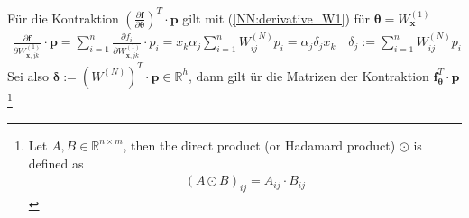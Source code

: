 \documentclass[a4paper, 12pt]{scrartcl}
\begin{document}
Für die Kontraktion $\left(\frac{\partial \bm{f}}{\partial \bm{\theta}}\right)^T \cdot \bm{p}$ gilt
mit (\ref{NN:derivative_W1}) für $\bm{\theta}= W_{\bm{x}}^{(1)}$
\begin{align*}
    \frac{\partial \bm{f}}{\partial W_{\bm{x}, jk}^{(1)}} \cdot \bm{p} 
    =
    \sum_{i=1}^{n} 
        \frac{\partial f_i}{\partial W_{\bm{x}, jk}^{(1)}} \cdot p_i 
    =
    x_k 
    \alpha_j 
    \sum_{i=1}^{n} 
    W_{ij}^{(N)} p_i
    =    
    \alpha_j 
    \delta_j
    x_k 
    \quad
    \delta_j := \sum_{i=1}^{n} W_{ij}^{(N)} p_i
\end{align*}
Sei also $\bm{\delta} := \left(W^{(N)}\right)^T \cdot \bm{p} \in \mathbb{R}^h$, dann gilt
ür die Matrizen der Kontraktion $\bm{f}_{\bm{\theta}}^T \cdot \bm{p}$
\footnote{
    Let $A,B \in \mathbb{R}^{n \times m}$, then the direct product 
    (or Hadamard product) $\odot$ is defined as
    \begin{align*}
        \left(A \odot B\right)_{ij} 
        =
        A_{ij} \cdot  B_{ij}
    \end{align*} 
}
\end{document}
